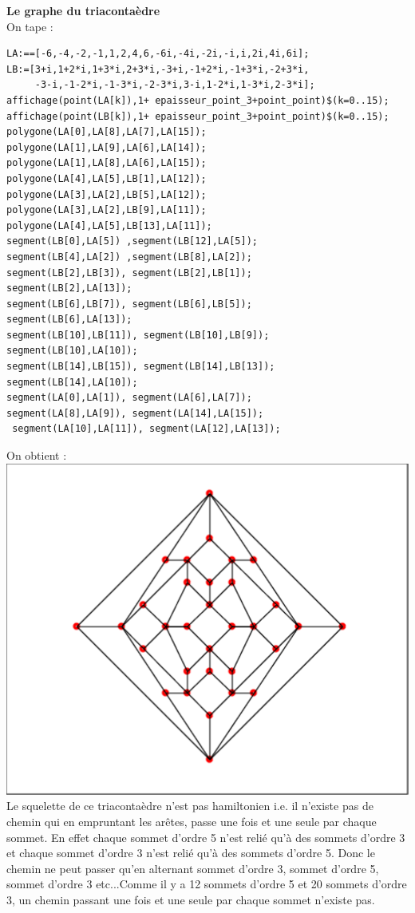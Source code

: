 \documentclass[a4paper,11pt]{book}
\begin{document}
{\bf Le graphe du triaconta\`edre}\\
On tape :
\begin{verbatim}
LA:==[-6,-4,-2,-1,1,2,4,6,-6i,-4i,-2i,-i,i,2i,4i,6i];
LB:=[3+i,1+2*i,1+3*i,2+3*i,-3+i,-1+2*i,-1+3*i,-2+3*i,
     -3-i,-1-2*i,-1-3*i,-2-3*i,3-i,1-2*i,1-3*i,2-3*i];
affichage(point(LA[k]),1+ epaisseur_point_3+point_point)$(k=0..15);
affichage(point(LB[k]),1+ epaisseur_point_3+point_point)$(k=0..15);
polygone(LA[0],LA[8],LA[7],LA[15]);
polygone(LA[1],LA[9],LA[6],LA[14]);
polygone(LA[1],LA[8],LA[6],LA[15]);
polygone(LA[4],LA[5],LB[1],LA[12]);
polygone(LA[3],LA[2],LB[5],LA[12]);
polygone(LA[3],LA[2],LB[9],LA[11]);
polygone(LA[4],LA[5],LB[13],LA[11]);
segment(LB[0],LA[5]) ,segment(LB[12],LA[5]);
segment(LB[4],LA[2]) ,segment(LB[8],LA[2]);
segment(LB[2],LB[3]), segment(LB[2],LB[1]); 
segment(LB[2],LA[13]);
segment(LB[6],LB[7]), segment(LB[6],LB[5]); 
segment(LB[6],LA[13]);
segment(LB[10],LB[11]), segment(LB[10],LB[9]);
segment(LB[10],LA[10]);
segment(LB[14],LB[15]), segment(LB[14],LB[13]); 
segment(LB[14],LA[10]);
segment(LA[0],LA[1]), segment(LA[6],LA[7]);
segment(LA[8],LA[9]), segment(LA[14],LA[15]);
 segment(LA[10],LA[11]), segment(LA[12],LA[13]);
\end{verbatim}
On obtient :\\
\includegraphics[width=\textwidth]{graphetriacon}\\

Le squelette de ce triaconta\`edre n'est pas hamiltonien
i.e. il n'existe pas de chemin qui en empruntant les ar\^etes, passe une fois 
et une seule par chaque sommet. En effet chaque sommet d'ordre 5 n'est reli\'e 
qu'\`a  des sommets d'ordre 3 et  chaque sommet d'ordre 3 n'est reli\'e 
qu'\`a  des sommets d'ordre 5. Donc le chemin ne peut passer qu'en alternant 
sommet d'ordre 3, sommet d'ordre 5, sommet d'ordre 3 etc...Comme il y a 12 
sommets d'ordre 5 et 20 sommets d'ordre 3, un chemin passant une fois 
et une seule par chaque sommet n'existe pas. 
\end{document}
